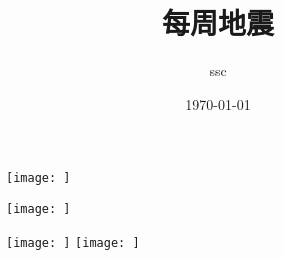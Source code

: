 \documentclass{beamer}
\begin{document}
	
	\begin{frame}
		
		\title{每周地震}
		\author{ssc}
		\date{\today}
		
		\titlepage
		
	\end{frame}

	\begin{frame}
		
		\begin{minipage}[c]{0.46\linewidth}
			\begin{figure}
				\texttt{[image: ]} %
			\end{figure}
		\end{minipage}\hspace{0.5cm}
		\begin{minipage}[c]{0.46\linewidth}
			\begin{figure}
				\texttt{[image: ]} %
			\end{figure}					
		\end{minipage}
		
	\end{frame}

	
	\begin{frame}
		
		\begin{figure}[htbp]
			
			\centering
			\texttt{[image: ]} %
			\texttt{[image: ]} %
			
		\end{figure}
		
	\end{frame}



	
	
\end{document}
